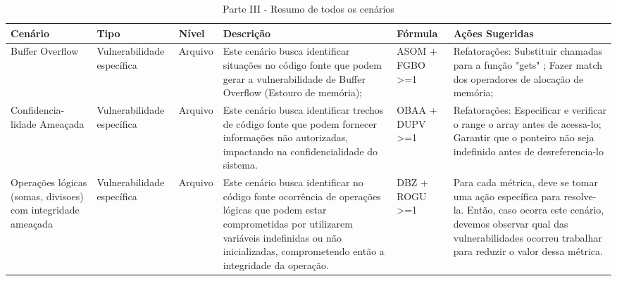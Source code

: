 \begin{landscape}
	\begin{table}[H]
		\begin{center}
	    \begin{tabular}{ |p{}| p{3cm} | p{2cm} | p{5cm} | p{3.5cm}  | p{6.5cm}  |}
	    \hline
Cenário                                                      & Tipo                       & Nível   & Descrição                                                                                                                                                                                                                                                                          & Fórmula                    & Ações Sugeridas                                                                                                                                                                                         \\ \hline
Buffer Overflow                                              & Vulnerabilidade específica & Arquivo & Este cenário busca identificar situações no código fonte que podem gerar a vulnerabilidade de Buffer Overflow (Estouro de memória);                                                                                                                                                & ASOM + FGBO \textgreater=1 & Refatorações: Substituir chamadas para a função "gets" ; Fazer match dos operadores de alocação de memória;                                                                                             \\ \hline
Confidencia-lidade Ameaçada                                   & Vulnerabilidade específica & Arquivo & Este cenário busca identificar trechos de código fonte que podem fornecer informações não autorizadas, impactando na confidencialidade do sistema.  & OBAA + DUPV \textgreater=1 & Refatorações: Especificar e verificar o range o array antes de acessa-lo; Garantir que o ponteiro não seja indefinido antes de desreferencia-lo                                                         \\ \hline
Operações lógicas (somas, divisoes) com integridade ameaçada & Vulnerabilidade específica & Arquivo & Este cenário busca identificar no código fonte ocorrência de operações lógicas que podem estar comprometidas por utilizarem variáveis indefinidas ou não inicializadas, comprometendo então a integridade da operação.                                                             & DBZ + ROGU \textgreater=1  & Para cada métrica, deve se tomar uma ação específica para resolve-la. Então, caso ocorra este cenário, devemos observar qual das vulnerabilidades ocorreu trabalhar para reduzir o valor dessa métrica. \\ \hline
\end{tabular}
		    \caption{Parte III - Resumo de todos os cenários}
		    \label{tab:resumo3}
		\end{center}
	\end{table}


\end{landscape}

